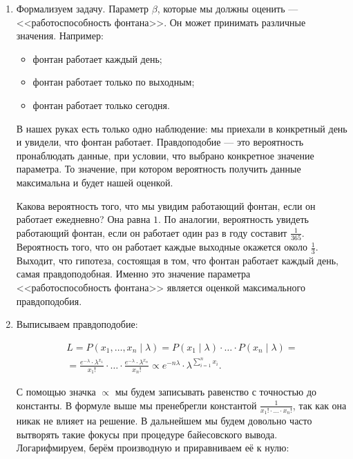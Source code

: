 \documentclass[12pt, a4paper, oneside]{extreport}
\theoremstyle{plain}              %
\theoremstyle{definition}         %
\begin{document}
\begin{sol}
	\begin{enumerate}	
	\item Формализуем задачу. Параметр $\beta$, которые мы должны оценить --- <<работоспособность фонтана>>. Он может принимать различные значения. Например:
	
	\begin{itemize}
		\item фонтан работает каждый день;
		\item фонтан работает только по выходным;
		\item фонтан работает только сегодня.
	\end{itemize}

	В нашех руках есть только одно наблюдение: мы приехали в конкретный день и увидели, что фонтан работает. Правдоподобие --- это вероятность пронаблюдать данные, при условии, что выбрано конкретное значение параметра. То значение, при котором вероятность получить данные максимальна и будет нашей оценкой. 
	
	 Какова вероятность того, что мы увидим работающий фонтан, если он работает ежедневно?  Она равна $1$. По аналогии, вероятность увидеть работающий фонтан, если он работает один раз в году составит $\frac{1}{365}$. Вероятность того, что он работает каждые выходные окажется около $\frac{1}{3}$.  Выходит, что гипотеза, состоящая в том, что фонтан работает каждый день, самая правдоподобная. Именно это значение параметра <<работоспособность фонтана>> является оценкой максимального правдоподобия. 
		
	\item Выписываем правдоподобие: 
	
	\begin{multline*}
	L = P(x_1, \ldots, x_n \mid \lambda) = P(x_1 \mid \lambda) \cdot \ldots \cdot P(x_n \mid \lambda) = \\ = \frac{e^{-\lambda} \cdot \lambda^{x_1}}{x_1!} \cdot \ldots \cdot \frac{e^{-\lambda} \cdot \lambda^{x_n}}{x_n!} \propto e^{-n \lambda} \cdot \lambda^{\sum_{i=1}^n x_i}.
	\end{multline*}
	
С помощью значка $\propto$ мы будем записывать равенство с точностью до константы. В формуле выше мы пренебрегли константой $\frac{1}{x_1! \cdot \ldots \cdot x_n!}$, так как она никак не влияет на решение. В дальнейшем мы будем довольно часто вытворять такие фокусы при процедуре байесовского вывода. Логарифмируем, берём производную и приравниваем её к нулю:
	

\end{enumerate}
\end{sol}
\end{document}
